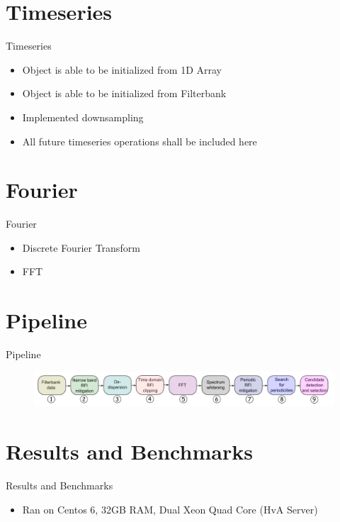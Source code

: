 \documentclass{beamer}
\begin{document}
\section{Timeseries}
\begin{frame}{Timeseries}
	\begin{itemize}
		\item Object is able to be initialized from 1D Array
		\item Object is able to be initialized from Filterbank
		\item Implemented downsampling
		\item All future timeseries operations shall be included here
	\end{itemize}
\end{frame}

\section{Fourier}
\begin{frame}{Fourier}
	\begin{itemize}
		\item Discrete Fourier Transform
		\item FFT
	\end{itemize}
\end{frame}

\section{Pipeline}
\begin{frame}{Pipeline}
	\begin{figure}
		\includegraphics[width=\textwidth]{pipeline-order}
	\end{figure}
\end{frame}

\section{Results and Benchmarks}
\begin{frame}{Results and Benchmarks}
	\begin{itemize}
		\item Ran on Centos 6, 32GB RAM, Dual Xeon Quad Core (HvA Server)
	\end{itemize}
\end{frame}
\end{document}
